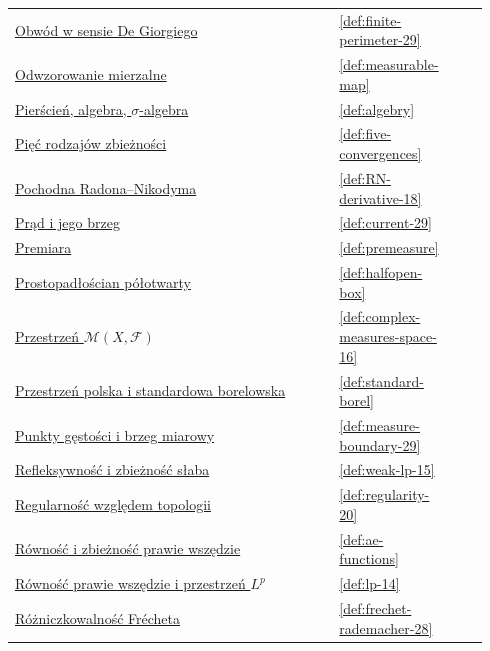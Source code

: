 \documentclass[11pt,a4paper,oneside]{book}
\numberwithin{equation}{chapter}
\theoremstyle{plain}
\theoremstyle{definition}
\theoremstyle{remark}
\begin{document}
\begin{longtable}{@{}p{0.72\linewidth}p{0.135\linewidth}p{0.08\linewidth}@{}}
\hyperref[def:finite-perimeter-29]{Obwód w sensie De Giorgiego} & \ref*{def:finite-perimeter-29} & \pageref*{def:finite-perimeter-29} \\
\hyperref[def:measurable-map]{Odwzorowanie mierzalne} & \ref*{def:measurable-map} & \pageref*{def:measurable-map} \\
\hyperref[def:algebry]{Pierścień, algebra, $\sigma$-algebra} & \ref*{def:algebry} & \pageref*{def:algebry} \\
\hyperref[def:five-convergences]{Pięć rodzajów zbieżności} & \ref*{def:five-convergences} & \pageref*{def:five-convergences} \\
\hyperref[def:RN-derivative-18]{Pochodna Radona--Nikodyma} & \ref*{def:RN-derivative-18} & \pageref*{def:RN-derivative-18} \\
\hyperref[def:current-29]{Prąd i jego brzeg} & \ref*{def:current-29} & \pageref*{def:current-29} \\
\hyperref[def:premeasure]{Premiara} & \ref*{def:premeasure} & \pageref*{def:premeasure} \\
\hyperref[def:halfopen-box]{Prostopadłościan półotwarty} & \ref*{def:halfopen-box} & \pageref*{def:halfopen-box} \\
\hyperref[def:complex-measures-space-16]{Przestrzeń $\mathcal M(X,\mathcal F)$} & \ref*{def:complex-measures-space-16} & \pageref*{def:complex-measures-space-16} \\
\hyperref[def:standard-borel]{Przestrzeń polska i standardowa borelowska} & \ref*{def:standard-borel} & \pageref*{def:standard-borel} \\
\hyperref[def:measure-boundary-29]{Punkty gęstości i brzeg miarowy} & \ref*{def:measure-boundary-29} & \pageref*{def:measure-boundary-29} \\
\hyperref[def:weak-lp-15]{Refleksywność i zbieżność słaba} & \ref*{def:weak-lp-15} & \pageref*{def:weak-lp-15} \\
\hyperref[def:regularity-20]{Regularność względem topologii} & \ref*{def:regularity-20} & \pageref*{def:regularity-20} \\
\hyperref[def:ae-functions]{Równość i zbieżność prawie wszędzie} & \ref*{def:ae-functions} & \pageref*{def:ae-functions} \\
\hyperref[def:lp-14]{Równość prawie wszędzie i przestrzeń $L^p$} & \ref*{def:lp-14} & \pageref*{def:lp-14} \\
\hyperref[def:frechet-rademacher-28]{Różniczkowalność Frécheta} & \ref*{def:frechet-rademacher-28} & \pageref*{def:frechet-rademacher-28} \\

\end{longtable}
\end{document}
